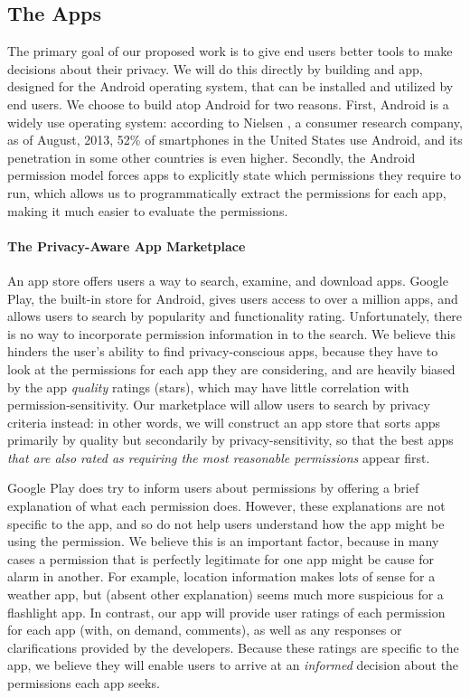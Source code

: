 \documentclass[11pt]{article}
\begin{document}
\subsection{The Apps}
\label{subsec-the-apps}

The primary goal of our proposed work is to give end users better tools to make decisions
about their privacy. We will do this directly by building and app, designed for the Android 
operating system, that can be installed 
and utilized by end users. We choose to build atop Android for two reasons.
First, Android is a widely use operating system: according to Nielsen 
\cite{android-market-share}, a consumer research 
company, as of August, 2013, 52\% of smartphones in the United
States use Android, and its penetration in some other countries is
even higher.
Secondly, the Android permission model forces apps to explicitly state which permissions
they require to run, which allows us to programmatically extract the permissions for each 
app, making it much easier to evaluate the permissions. 

\paragraph{The Privacy-Aware App Marketplace}
\label{subsubsec-privacy-store}

An app store offers users a way to search, examine, and download
apps.  Google Play, the built-in store for Android, gives
users access to over a million apps, and allows users to search by
popularity and functionality rating. Unfortunately, there is no way to incorporate
permission information in to the search. We believe this hinders the
user's ability to find privacy-conscious apps, because they have to
look at the permissions for each app they are considering, and are
heavily biased by the app \emph{quality} ratings (stars), which may
have little correlation with permission-sensitivity. Our marketplace
will allow users to search by privacy criteria instead: in other
words, we will construct an app store that sorts apps primarily by
quality but secondarily by privacy-sensitivity, so that the best apps
\emph{that are also rated as requiring the most reasonable
  permissions} appear first.

Google Play does try to inform users about permissions by offering a
brief explanation of what each permission does. However, these
explanations are not specific to the app, and so do not help
users understand how the app might be using the permission. We
believe this is an important factor, because in many cases a
permission that is perfectly legitimate for one app might be cause for
alarm in another. For example, location information makes lots of
sense for a weather app, but (absent other explanation) seems much
more suspicious for a flashlight app. In contrast, our app will
provide user ratings of each permission for each app (with, on demand,
comments), as well as any responses or clarifications provided by the
developers. Because these ratings are specific to the app, we believe
they will enable users to arrive at an \emph{informed} decision about
the permissions each app seeks.
\end{document}
